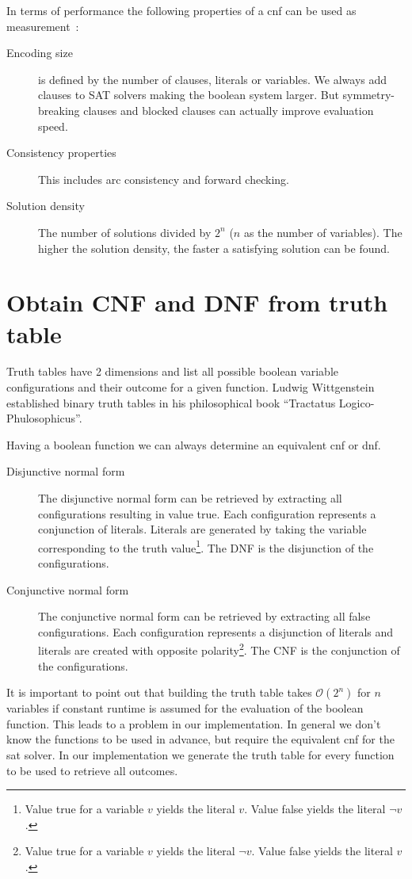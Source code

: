 In terms of performance the following properties of a \gls{cnf} can be used as measurement~\cite{Sat20}:
\begin{description}
  \item[Encoding size]
    is defined by the number of clauses, literals or variables.
    We always add clauses to SAT solvers making the boolean system larger. But symmetry-breaking clauses and blocked clauses can actually improve evaluation speed.
  \item[Consistency properties]
    This includes arc consistency and forward checking.
  \item[Solution density]
    The number of solutions divided by $2^n$ ($n$ as the number of variables). The higher the solution density, the faster a satisfying solution can be found.
\end{description}

\section{Obtain CNF and DNF from truth table}
\label{sec:cnf-dnf}
%
Truth tables have 2 dimensions and list all possible boolean variable configurations and their outcome for a given function. Ludwig Wittgenstein established binary truth tables in his philosophical book ``Tractatus Logico-Phulosophicus''.

Having a boolean function we can always determine an equivalent \gls{cnf} or \gls{dnf}.

\begin{description}
  \item[Disjunctive normal form]
    The disjunctive normal form can be retrieved by extracting all configurations resulting in value true. Each configuration represents a conjunction of literals. Literals are generated by taking the variable corresponding to the truth value\footnote{Value true for a variable $v$ yields the literal $v$. Value false yields the literal $\neg v$.}. The DNF is the disjunction of the configurations.
  \item[Conjunctive normal form]
    The conjunctive normal form can be retrieved by extracting all false configurations. Each configuration represents a disjunction of literals and literals are created with opposite polarity\footnote{Value true for a variable $v$ yields the literal $\neg v$. Value false yields the literal $v$.}. The CNF is the conjunction of the configurations.
\end{description}

It is important to point out that building the truth table takes $\mathcal{O}(2^n)$ for $n$ variables if constant runtime is assumed for the evaluation of the boolean function. This leads to a problem in our implementation. In general we don't know the functions to be used in advance, but require the equivalent \gls{cnf} for the \gls{sat} solver. In our implementation we generate the truth table for every function to be used to retrieve all outcomes.

